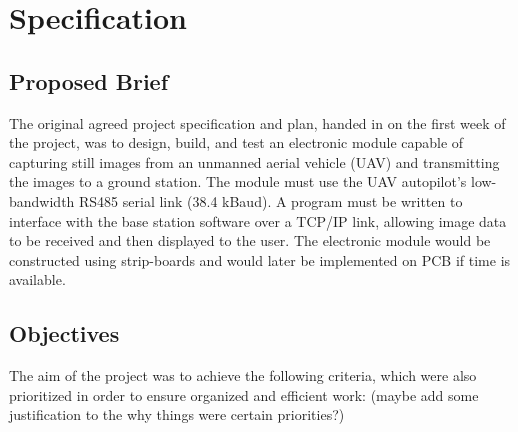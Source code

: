 \documentclass[oneside]{ecsgdp}         %
\begin{document}


\chapter{Specification}

\section{Proposed Brief}
The original agreed project specification and plan, handed in on the first week of the project, was to design, build, and test an electronic module capable of capturing still images from an unmanned aerial vehicle (UAV) and transmitting the images to a ground station. The module must use the UAV autopilot’s low-bandwidth RS485 serial link (38.4 kBaud). A program must be written to interface with the base station software over a TCP/IP link, allowing image data to be received and then displayed to the user. The electronic module would be constructed using strip-boards and would later be implemented on PCB if time is available.


\section{Objectives} 
The aim of the project was to achieve the following criteria, which were also prioritized in order to ensure organized and efficient work: (maybe add some justification to the why things were certain priorities?)
\end{document}
